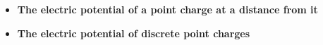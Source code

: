 \begin{ELunit}

\begin{itemize}
\tightlist
\item
  \textbf{The electric potential of a point charge  at a distance  from it}
\end{itemize}



\begin{itemize}
\tightlist
\item
  \textbf{The electric potential of  discrete point charges}
\end{itemize}


\end{ELunit}

